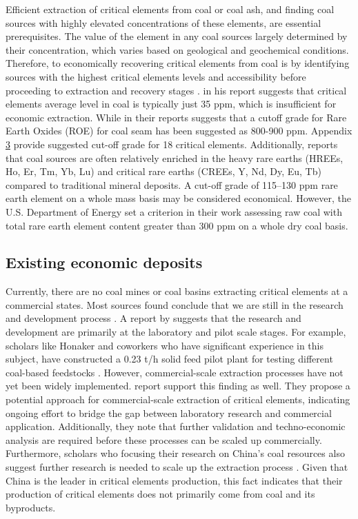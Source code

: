 \documentclass[11pt,a4paper,]{article}
\begin{document}
Efficient extraction of critical elements from coal or coal ash, and finding coal sources with highly elevated concentrations of these elements, are essential prerequisites. The value of the element in any coal sources largely determined by their concentration, which varies based on geological and geochemical conditions. Therefore, to economically recovering critical elements from coal is by identifying sources with the highest critical elements levels and accessibility before proceeding to extraction and recovery stages \autocite{Eterigho2021}. \textcite{Reid2018} in his report suggests that critical elements average level in coal is typically just 35 ppm, which is insufficient for economic extraction. While \textcite{Seredin2012} in their reports suggests that a cutoff grade for Rare Earth Oxides (ROE) for coal seam has been suggested as 800-900 ppm. Appendix \href{\%7B\#appendix-three\%7D}{3} provide suggested cut-off grade for 18 critical elements. Additionally, \textcite{TALAN2022107897} reports that coal sources are often relatively enriched in the heavy rare earths (HREEs, Ho, Er, Tm, Yb, Lu) and critical rare earths (CREEs, Y, Nd, Dy, Eu, Tb) compared to traditional mineral deposits. A cut-off grade of 115--130 ppm rare earth element on a whole mass basis may be considered economical. However, the U.S. Department of Energy set a criterion in their work assessing raw coal with total rare earth element content greater than 300 ppm on a whole dry coal basis.

\subsection{Existing economic deposits}\label{existing-economic-deposits}

Currently, there are no coal mines or coal basins extracting critical elements at a commercial states. Most sources found conclude that we are still in the research and development process \autocite{Hodgkinson2020,DAI2018155,Eterigho2021,osti_1808639,TALAN2022107897}. A report by \textcite{Eterigho2021} suggests that the research and development are primarily at the laboratory and pilot scale stages. For example, scholars like Honaker and coworkers who have significant experience in this subject, have constructed a 0.23 t/h solid feed pilot plant for testing different coal-based feedstocks \autocite{osti_1808639}. However, commercial-scale extraction processes have not yet been widely implemented. \textcite{TALAN2022107897} report support this finding as well. They propose a potential approach for commercial-scale extraction of critical elements, indicating ongoing effort to bridge the gap between laboratory research and commercial application. Additionally, they note that further validation and techno-economic analysis are required before these processes can be scaled up commercially. Furthermore, scholars who focusing their research on China's coal resources also suggest further research is needed to scale up the extraction process \autocite{Qin2015,Qin2015b,Liu2024,Zhao2019,ZOU2023105245}. Given that China is the leader in critical elements production, this fact indicates that their production of critical elements does not primarily come from coal and its byproducts.
\end{document}
